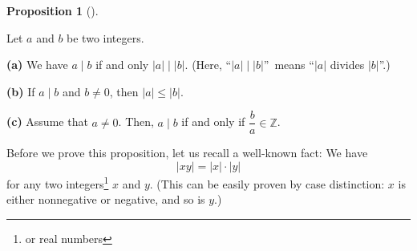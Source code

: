 \documentclass[numbers=enddot,12pt,final,onecolumn,notitlepage]{scrartcl}%
\numberwithin{exer}{subsection}
\theoremstyle{definition}
\newtheorem{prop}[theo]{Proposition}
\newenvironment{proposition}[1][]
{\begin{prop}[#1]\begin{leftbar}}
{\end{leftbar}\end{prop}}
\begin{document}
\begin{proposition}
\label{prop.ent.div.1}Let $a$ and $b$ be two integers.

\textbf{(a)} We have $a\mid b$ if and only $\left\vert a\right\vert
\mid\left\vert b\right\vert $. (Here, \textquotedblleft$\left\vert
a\right\vert \mid\left\vert b\right\vert $\textquotedblright\ means
\textquotedblleft$\left\vert a\right\vert $ divides $\left\vert b\right\vert
$\textquotedblright.)

\textbf{(b)} If $a\mid b$ and $b\neq0$, then $\left\vert a\right\vert
\leq\left\vert b\right\vert $.

\textbf{(c)} Assume that $a\neq0$. Then, $a\mid b$ if and only if $\dfrac
{b}{a}\in\mathbb{Z}$.
\end{proposition}

Before we prove this proposition, let us recall a well-known fact: We have
\begin{equation}
\left\vert xy\right\vert =\left\vert x\right\vert \cdot\left\vert y\right\vert
\label{eq.ent.div.abs(xy)}%
\end{equation}
for any two integers\footnote{or real numbers} $x$ and $y$. (This can be
easily proven by case distinction: $x$ is either nonnegative or negative, and
so is $y$.)
\end{document}
